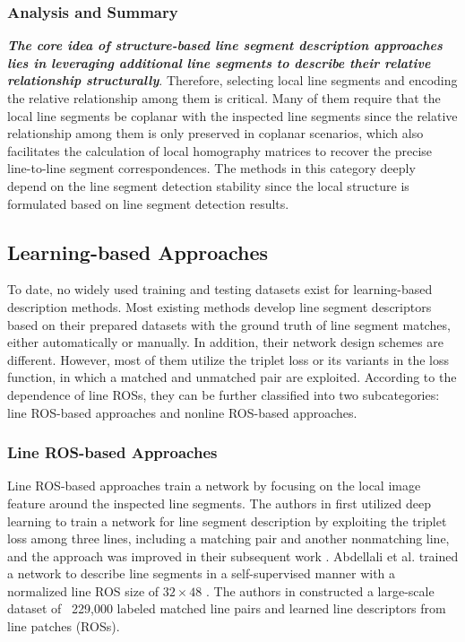 \documentclass[journal,compsoc]{IEEEtran}
\begin{document}
\subsubsection{Analysis and Summary}
\textbf{\textit{The core idea of structure-based line segment description approaches lies in leveraging additional line segments to describe their relative relationship structurally}}. Therefore, selecting local line segments and encoding the relative relationship among them is critical. Many of them require that the local line segments be coplanar with the inspected line segments since the relative relationship among them is only preserved in coplanar scenarios, which also facilitates the calculation of local homography matrices to recover the precise line-to-line segment correspondences. The methods in this category deeply depend on the line segment detection stability since the local structure is formulated based on line segment detection results.


\subsection{Learning-based Approaches}
\label{subsec_description_learning}
To date, no widely used training and testing datasets exist for learning-based description methods. Most existing methods develop line segment descriptors based on their prepared datasets with the ground truth of line segment matches, either automatically or manually. In addition, their network design schemes are different. However, most of them utilize the triplet loss \cite{NIPS2017_831caa1b} or its variants in the loss function, in which a matched and unmatched pair are exploited. According to the dependence of line ROSs, they can be further classified into two subcategories: line ROS-based approaches and nonline ROS-based approaches.

\subsubsection{Line ROS-based Approaches} \label{subsec_description_learning_ros} Line ROS-based approaches \cite{Abinaryrobustlinedescriptor,DLD,WLD,L2D2,Towardslearninglinedescriptorsfrompatchesanewparadigmandlargescaledataset} train a network by focusing on the local image feature around the inspected line segments. The authors in \cite{DLD} first utilized deep learning to train a network for line segment description by exploiting the triplet loss among three lines, including a matching pair and another nonmatching line, and the approach was improved in their subsequent work \cite{WLD}. Abdellali et al. trained a network to describe line segments in a self-supervised manner with a normalized line ROS size of $32 \times 48$ \cite{L2D2}. The authors in \cite{Towardslearninglinedescriptorsfrompatchesanewparadigmandlargescaledataset} constructed a large-scale dataset of ~229,000 labeled matched line pairs and learned line descriptors from line patches (ROSs).
\end{document}
